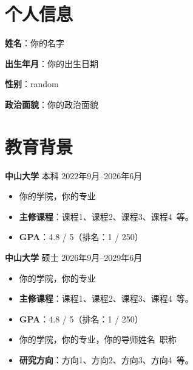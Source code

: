 \documentclass[11pt]{article}
\newlength{\iconwidth}
\begin{document}
    \begin{minipage}[t]{0.78\textwidth}
        \begin{minipage}[t]{\textwidth}
        \section[个人信息]{\makebox[\iconwidth][c]{\color{SYSU_Green}{\faAddressCard}}\quad 个人信息}
        \begin{minipage}[t]{0.5\textwidth}
            \textbf{姓\qquad 名}：你的名字
            
            \vspace{0.5em}
            \textbf{出生年月}：你的出生日期
        \end{minipage}
        \begin{minipage}[t]{0.35\textwidth}
            \textbf{性\qquad 别}：random
            
            \vspace{0.5em}
            \textbf{政治面貌}：你的政治面貌
        \end{minipage}
        \vspace{1.2em}
        \end{minipage}

        \begin{minipage}[t]{\textwidth}
        \section[教育背景]{\makebox[\iconwidth][c]{\color{SYSU_Green}{\faGraduationCap}}\quad 教育背景}
        
        {\large \textbf{中山大学}} 本科 \hfill 2022年9月--2026年6月
        \begin{itemize}
            \item 你的学院，你的专业
            \item \textbf{主修课程}：课程1、课程2、课程3、课程4\ 等。
            \item \textbf{GPA}：4.8 / 5（排名：1 / 250）%
        \end{itemize}
        
        \vspace{0.5em}
        {\large \textbf{中山大学}} 硕士 \hfill 2026年9月--2029年6月
        \begin{itemize}
            \item 你的学院，你的专业
            \item \textbf{主修课程}：课程1、课程2、课程3、课程4\ 等。
            \item \textbf{GPA}：4.8 / 5（排名：1 / 250）%
            \item 你的学院，你的专业，你的导师姓名\ 职称             
            \item \textbf{研究方向}：方向1、方向2、方向3、方向4\ 等。
        \end{itemize}
        

\end{minipage}
\end{minipage}
\end{document}
